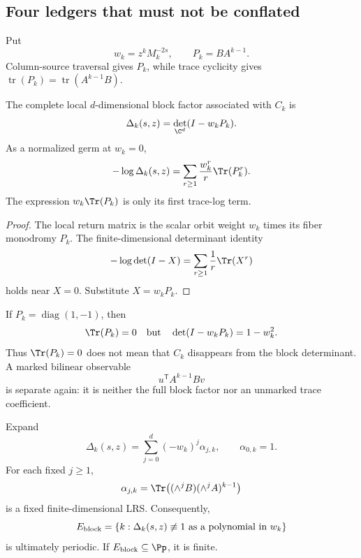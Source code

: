\subsection{Four ledgers that must not be conflated}

Put
\[
        w_k=z^kM_k^{-2s},
\qquad
        P_k=BA^{k-1}.
\]
Column-source traversal gives \(P_k\), while trace cyclicity gives
\(\operatorname{tr}(P_k)=\operatorname{tr}(A^{k-1}B)\).

\begin{proposition}
\label{prop:blockfactor}
The complete local \(d\)-dimensional block factor associated with \(C_k\) is
\[
        \Delta_k(s,z)
        =\det_{\C^d}(I-w_kP_k).
\]
As a normalized germ at \(w_k=0\),
\[
 -\log\Delta_k(s,z)
 =\sum_{r\ge1}\frac{w_k^r}{r}\Tr(P_k^r).
\]
The expression \(w_k\Tr(P_k)\) is only its first trace-log term.
\end{proposition}

\begin{proof}
The local return matrix is the scalar orbit weight \(w_k\) times its fiber
monodromy \(P_k\).  The finite-dimensional determinant identity
\[
        -\log\det(I-X)
        =\sum_{r\ge1}\frac1r\Tr(X^r)
\]
holds near \(X=0\).  Substitute \(X=w_kP_k\).
\end{proof}

\begin{remark}
\label{rem:tracenotfactor}
If \(P_k=\operatorname{diag}(1,-1)\), then
\[
        \Tr(P_k)=0
\quad\hbox{but}\quad
        \det(I-w_kP_k)=1-w_k^2.
\]
Thus \(\Tr(P_k)=0\) does not mean that \(C_k\) disappears from the block
determinant.  A marked bilinear observable
\[
        u^{\mathsf T}A^{k-1}Bv
\]
is separate again: it is neither the full block factor nor an unmarked
trace coefficient.
\end{remark}

\begin{theorem}
\label{thm:exteriorlrs}
Expand
\[
 \Delta_k(s,z)
 =\sum_{j=0}^d(-w_k)^j\alpha_{j,k},
\qquad
 \alpha_{0,k}=1.
\]
For each fixed \(j\ge1\),
\[
 \alpha_{j,k}
 =\Tr\!\left((\wedge^jB)(\wedge^jA)^{k-1}\right)
\]
is a fixed finite-dimensional LRS.  Consequently,
\[
 E_{\rm block}
 =\{k:\Delta_k(s,z)\not\equiv1
      \text{ as a polynomial in }w_k\}
\]
is ultimately periodic.  If \(E_{\rm block}\subseteq\Pp\), it is finite.
\end{theorem}

